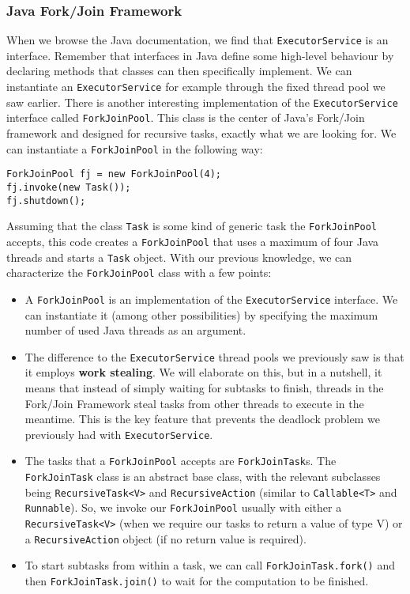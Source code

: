 \documentclass[main.tex]{subfiles}
\begin{document}
\subsubsection{Java Fork/Join Framework}
When we browse the Java documentation, we find that \texttt{ExecutorService} is an interface. Remember that interfaces in Java define some high-level behaviour by declaring methods that classes can then specifically implement. We can instantiate an \texttt{ExecutorService} for example through the fixed thread pool we saw earlier. There is another interesting implementation of the \texttt{ExecutorService} interface called \texttt{ForkJoinPool}. This class is the center of Java's Fork/Join framework and designed for recursive tasks, exactly what we are looking for. We can instantiate a \texttt{ForkJoinPool} in the following way:

\begin{verbatim}
ForkJoinPool fj = new ForkJoinPool(4);
fj.invoke(new Task());
fj.shutdown();
\end{verbatim}

\noindent Assuming that the class \texttt{Task} is some kind of generic task the \texttt{ForkJoinPool} accepts, this code creates a \texttt{ForkJoinPool} that uses a maximum of four Java threads and starts a \texttt{Task} object. With our previous knowledge, we can characterize the \texttt{ForkJoinPool} class with a few points:

\begin{itemize}
  \item A \texttt{ForkJoinPool} is an implementation of the \texttt{ExecutorService} interface. We can instantiate it (among other possibilities) by specifying the maximum number of used Java threads as an argument.
  \item The difference to the \texttt{ExecutorService} thread pools we previously saw is that it employs \textbf{work stealing}. We will elaborate on this, but in a nutshell, it means that instead of simply waiting for subtasks to finish, threads in the Fork/Join Framework steal tasks from other threads to execute in the meantime. This is the key feature that prevents the deadlock problem we previously had with \texttt{ExecutorService}.
  \item The tasks that a \texttt{ForkJoinPool} accepts are \texttt{ForkJoinTask}s. The \texttt{ForkJoinTask} class is an abstract base class, with the relevant subclasses being \texttt{RecursiveTask<V>} and \texttt{RecursiveAction} (similar to \texttt{Callable<T>} and \texttt{Runnable}). So, we invoke our \texttt{ForkJoinPool} usually with either a \texttt{RecursiveTask<V>} (when we require our tasks to return a value of type V) or a \texttt{RecursiveAction} object (if no return value is required).
  \item To start subtasks from within a task, we can call \texttt{ForkJoinTask.fork()} and then \texttt{ForkJoinTask.join()} to wait for the computation to be finished.
\end{itemize}
\end{document}
